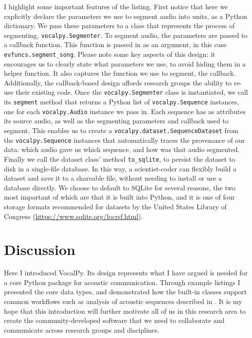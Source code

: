 \documentclass[11pt]{article}
\begin{document}
I highlight some important features of the listing. First notice that here we explicitly declare the parameters we use to segment audio into units, as a Python dictionary. We pass these parameters to a class that represents the process of segmenting, \texttt{vocalpy.Segmenter}. To segment audio, the parameters are passed to a callback function. This function is passed in as an argument, in this case \texttt{evfuncs.segment\_song}. Please note some key aspects of this design: it encourages us to clearly state what parameters we use, to avoid hiding them in a helper function. It also captures the function we use to segment, the callback. Additionally, the callback-based design affords research groups the ability to re-use their existing code. Once the \texttt{vocalpy.Segmenter} class is instantiated, we call its \texttt{segment} method that returns a Python list of \texttt{vocalpy.Sequence} instances, one for each \texttt{vocalpy.Audio} instance we pass in. Each sequence has as attributes its source audio, as well as the segmenting parameters and callback used to segment. This enables us to create a \texttt{vocalpy.dataset.SequenceDataset} from the \texttt{vocalpy.Sequence} instances that automatically traces the provenance of our data: which audio gave us which sequence, and how was that audio segmented. Finally we call the dataset class' method \texttt{to\_sqlite}, to persist the dataset to disk in a single-file database. In this way, a scientist-coder can flexibly build a dataset and save it to a shareable file, without needing to install or use a database directly. We choose to default to SQLite for several reasons, the two most important of which are that it is built into Python, and it is one of four storage formats recommended for datasets by the United States Library of Congress (\url{https://www.sqlite.org/locrsf.html}).

\section{Discussion}

Here I introduced VocalPy. Its design represents what I have argued is needed for a core Python package for acoustic communication. Through example listings I presented the core data types, and demonstrated how the built-in classes support common workflows such as analysis of acoustic sequences described in \cite{kershenbaumAcousticSequencesNonhuman2016}. It is my hope that this introduction will further motivate all of us in this research area to create the community-developed software that we need to collaborate and communicate across research groups and disciplines.


\end{document}
